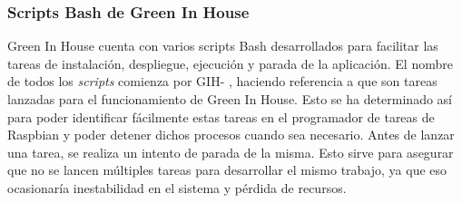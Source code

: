         \subsubsection{Scripts Bash de Green In House}
        Green In House cuenta con varios scripts Bash desarrollados para facilitar las tareas de instalación, despliegue, ejecución y parada de la aplicación. El nombre de todos los \textit{scripts} comienza por GIH- , haciendo referencia a que son tareas lanzadas para el funcionamiento de Green In House. Esto se ha determinado así para poder identificar fácilmente estas tareas en el programador de tareas de Raspbian y poder detener dichos procesos cuando sea necesario. Antes de lanzar una tarea, se realiza un intento de parada de la misma. Esto sirve para asegurar que no se lancen múltiples tareas para desarrollar el mismo trabajo, ya que eso ocasionaría inestabilidad en el sistema y pérdida de recursos.
